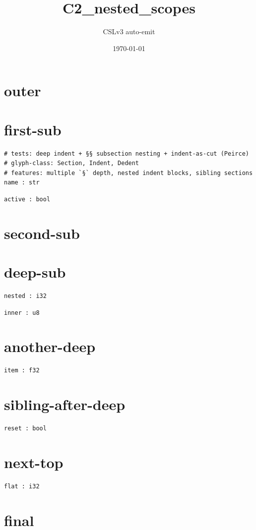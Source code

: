 \documentclass[11pt]{article}
\title{C2\_nested\_scopes}
\author{CSLv3 auto-emit}
\date{\today}
\begin{document}
\maketitle
\tableofcontents

\section{outer}\label{sec:outer}
\section{first-sub}\label{sec:first-sub}
\begin{lstlisting}[language=csl]
# tests: deep indent + §§ subsection nesting + indent-as-cut (Peirce)
# glyph-class: Section, Indent, Dedent
# features: multiple `§` depth, nested indent blocks, sibling sections
name : str
\end{lstlisting}
\begin{lstlisting}[language=csl]
active : bool
\end{lstlisting}
\section{second-sub}\label{sec:second-sub}
\section{deep-sub}\label{sec:deep-sub}
\begin{lstlisting}[language=csl]
nested : i32
\end{lstlisting}
\begin{lstlisting}[language=csl]
inner : u8
\end{lstlisting}
\section{another-deep}\label{sec:another-deep}
\begin{lstlisting}[language=csl]
item : f32
\end{lstlisting}
\section{sibling-after-deep}\label{sec:sibling-after-deep}
\begin{lstlisting}[language=csl]
reset : bool
\end{lstlisting}
\section{next-top}\label{sec:next-top}
\begin{lstlisting}[language=csl]
flat : i32
\end{lstlisting}
\section{final}\label{sec:final}
\end{document}
